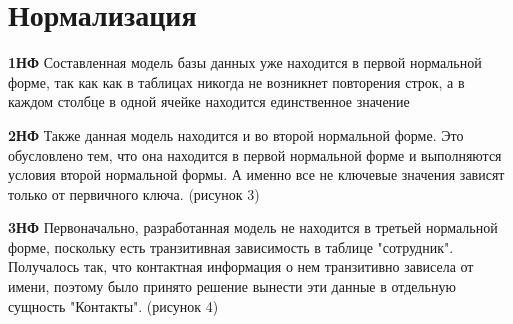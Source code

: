 \documentclass[14pt]{extreport}
\begin{document}


\section{Нормализация}
\textbf{1НФ}
Составленная модель базы данных уже находится в первой нормальной форме, так как как в таблицах никогда не возникнет повторения строк, а в каждом столбце в одной ячейке находится единственное значение


\textbf{2НФ}
Также данная модель находится и во второй нормальной форме. Это обусловлено тем, что она находится в первой нормальной форме и выполняются условия второй нормальной формы. А именно все не ключевые значения зависят только от первичного ключа. (рисунок 3)


\textbf{3НФ}
Первоначально, разработанная модель не находится в третьей нормальной форме, поскольку есть транзитивная зависимость в таблице "сотрудник". Получалось так, что контактная информация о нем транзитивно зависела от имени, поэтому было принято решение вынести эти данные в отдельную сущность "Контакты". (рисунок 4)
\end{document}

